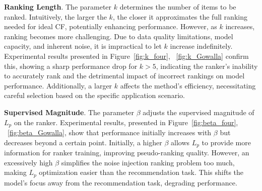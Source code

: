 \textbf{Ranking Length}. The parameter $k$ determines the number of items to be ranked. Intuitively, the larger the $k$, the closer it approximates the full ranking needed for ideal CF, potentially enhancing performance. However, as $k$ increases, ranking becomes more challenging. Due to data quality limitations, model capacity, and inherent noise, it is impractical to let $k$ increase indefinitely. Experimental results presented in Figure~\ref{fig:k_four}, ~\ref{fig:k_Gowalla} confirm this, showing a sharp performance drop for $k>5$, indicating the ranker's inability to accurately rank and the detrimental impact of incorrect rankings on model performance. Additionally, a larger $k$ affects the method's efficiency, necessitating careful selection based on the specific application scenario.

\textbf{Supervised Magnitude}. The parameter $\beta$ adjusts the supervised magnitude of $L_p$ on the ranker. Experimental results, presented in Figure~\ref{fig:beta_four}, ~\ref{fig:beta_Gowalla}, show that performance initially increases with $\beta$ but decreases beyond a certain point. Initially, a higher $\beta$ allows $L_p$ to provide more information for ranker training, improving pseudo-ranking quality. However, an excessively high $\beta$ simplifies the noise injection ranking problem too much, making $L_p$ optimization easier than the recommendation task. This shifts the model's focus away from the recommendation task, degrading performance.
